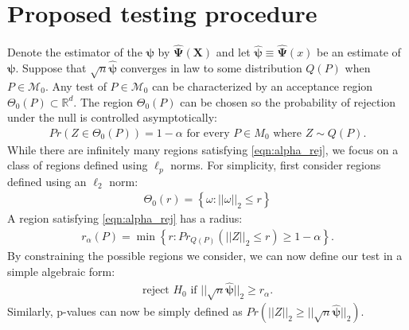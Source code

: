 \documentclass{article}
\newcommand{\rvo}{X}
\newcommand{\disto}{P}
\newcommand{\rvv}{Z}
\newcommand{\distv}{Q}
\begin{document}
\section{Proposed testing procedure}
\label{sec:prop_test_proc}
Denote the estimator of the $\boldsymbol{\psi}$ by $\hat{\boldsymbol{\Psi}}(\boldsymbol{\rvo})$ and let $\hat{\boldsymbol{\psi}} \equiv \hat{\boldsymbol{\Psi}}(x)$ be an estimate of $\boldsymbol{\psi}$. Suppose that $\sqrt{n}\hat{\boldsymbol{\psi}}$ converges in law to some distribution $\distv(P)$ when $\disto \in \mathscr{M}_0$.  Any test of $\disto \in \mathscr{M}_0$ can be characterized by an acceptance region $\Theta_0(\disto) \subset \mathbb{R}^d$. The region $\Theta_0(\disto)$ can be chosen so the probability of rejection under the null is controlled asymptotically:
\begin{align}
  Pr(\rvv \in \Theta_0(P)) = 1 - \alpha \text{ for every } P \in M_0 \text{ where } \rvv \sim \distv(\disto).\label{eqn:alpha_rej}
\end{align}
While there are infinitely many regions satisfying \eqref{eqn:alpha_rej},  we focus on a class of regions defined using $\ell_p$ norms. For simplicity, first consider regions defined using an $\ell_2$ norm:
\begin{align*}
	\Theta_0(r) = \left\{\omega : ||\omega||_2 \leq r\right\}
\end{align*}
A region satisfying \eqref{eqn:alpha_rej} has a radius: 
\begin{align*}
	r_\alpha(\disto) = \min\left\{r : Pr_{\distv(\disto)}(||\rvv||_2 \leq r) \geq 1 - \alpha \right\}.
\end{align*}
By constraining the possible regions we consider, we can now define our test in a simple algebraic form:
\begin{align*}
	\text{reject } H_0 \text{ if } ||\sqrt{n} \hat{\boldsymbol{\psi}}||_2 \geq r_\alpha.
\end{align*}
Similarly, p-values can now be simply defined as $Pr(||\rvv||_2 \geq ||\sqrt{n} \hat{\boldsymbol{\psi}}||_2)$.


\end{document}
